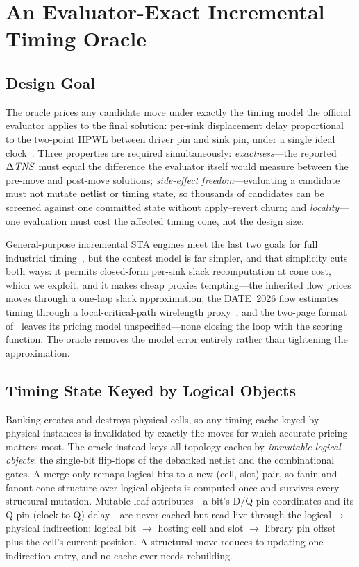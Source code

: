 \section{An Evaluator-Exact Incremental Timing Oracle}
\label{sec:oracle}

\subsection{Design Goal}
\label{sec:oracle:goal}

The oracle prices any candidate move under exactly the timing model the official evaluator applies to the final solution: per-sink displacement delay proportional to the two-point HPWL between driver pin and sink pin, under a single ideal clock~\cite{yang2024contest}. Three properties are required simultaneously: \emph{exactness}---the reported $\Delta\mathit{TNS}$ must equal the difference the evaluator itself would measure between the pre-move and post-move solutions; \emph{side-effect freedom}---evaluating a candidate must not mutate netlist or timing state, so thousands of candidates can be screened against one committed state without apply--revert churn; and \emph{locality}---one evaluation must cost the affected timing cone, not the design size.

General-purpose incremental STA engines meet the last two goals for full industrial timing~\cite{huang2015opentimer,huang2021opentimer2}, but the contest model is far simpler, and that simplicity cuts both ways: it permits closed-form per-sink slack recomputation at cone cost, which we exploit, and it makes cheap proxies tempting---the inherited flow prices moves through a one-hop slack approximation, the DATE~2026 flow estimates timing through a local-critical-path wirelength proxy~\cite{chen2026agile}, and the two-page format of~\cite{li2025lbr} leaves its pricing model unspecified---none closing the loop with the scoring function. The oracle removes the model error entirely rather than tightening the approximation.

\subsection{Timing State Keyed by Logical Objects}
\label{sec:oracle:keying}

Banking creates and destroys physical cells, so any timing cache keyed by physical instances is invalidated by exactly the moves for which accurate pricing matters most. The oracle instead keys all topology caches by \emph{immutable logical objects}: the single-bit flip-flops of the debanked netlist and the combinational gates. A merge only remaps logical bits to a new (cell, slot) pair, so fanin and fanout cone structure over logical objects is computed once and survives every structural mutation. Mutable leaf attributes---a bit's D/Q pin coordinates and its Q-pin (clock-to-Q) delay---are never cached but read live through the logical$\to$physical indirection: logical bit $\to$ hosting cell and slot $\to$ library pin offset plus the cell's current position. A structural move reduces to updating one indirection entry, and no cache ever needs rebuilding.

